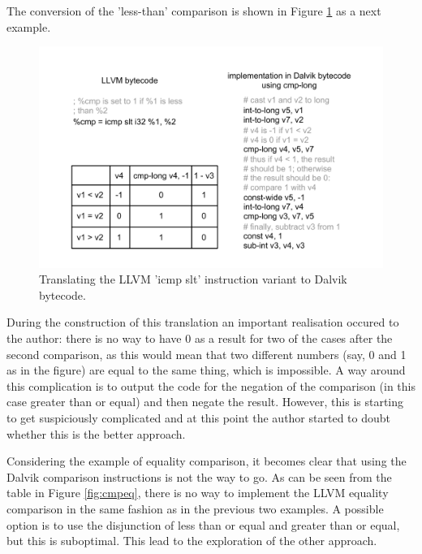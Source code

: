 \documentclass[parskip]{cs4rep}
\begin{document}
The conversion of the 'less-than' comparison is shown in Figure \ref{fig:cmpslt} as a next example.

\begin{figure}[h!]
    \centering
        \includegraphics[width=1.0\textwidth]{cmpslt}
    \caption{Translating the LLVM 'icmp slt' instruction variant to Dalvik bytecode.}
    \label{fig:cmpslt}
\end{figure}

During the construction of this translation an important realisation occured to the author: there is no way to have 0 as a result for two of the cases after the second comparison, as this would mean that two different numbers (say, 0 and 1 as in the figure) are equal to the same thing, which is impossible. A way around this complication is to output the code for the negation of the comparison (in this case greater than or equal) and then negate the result. However, this is starting to get suspiciously complicated and at this point the author started to doubt whether this is the better approach.

Considering the example of equality comparison, it becomes clear that using the Dalvik comparison instructions is not the way to go. As can be seen from the table in Figure \ref{fig:cmpeq}, there is no way to implement the LLVM equality comparison in the same fashion as in the previous two examples. A possible option is to use the disjunction of less than or equal and greater than or equal, but this is suboptimal. This lead to the exploration of the other approach.
\end{document}
